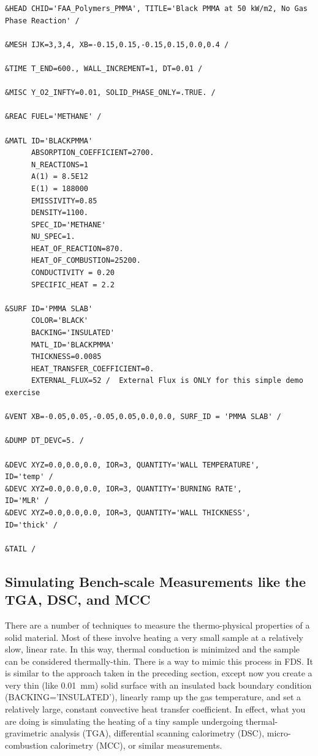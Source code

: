 \documentclass[11pt]{book}
\begin{document}
\begin{lstlisting}[basicstyle=\scriptsize\ttfamily]
&HEAD CHID='FAA_Polymers_PMMA', TITLE='Black PMMA at 50 kW/m2, No Gas Phase Reaction' /

&MESH IJK=3,3,4, XB=-0.15,0.15,-0.15,0.15,0.0,0.4 /

&TIME T_END=600., WALL_INCREMENT=1, DT=0.01 /

&MISC Y_O2_INFTY=0.01, SOLID_PHASE_ONLY=.TRUE. /

&REAC FUEL='METHANE' /

&MATL ID='BLACKPMMA'
      ABSORPTION_COEFFICIENT=2700.
      N_REACTIONS=1
      A(1) = 8.5E12
      E(1) = 188000
      EMISSIVITY=0.85
      DENSITY=1100.
      SPEC_ID='METHANE'
      NU_SPEC=1.
      HEAT_OF_REACTION=870.
      HEAT_OF_COMBUSTION=25200.
      CONDUCTIVITY = 0.20
      SPECIFIC_HEAT = 2.2

&SURF ID='PMMA SLAB'
      COLOR='BLACK'
      BACKING='INSULATED'
      MATL_ID='BLACKPMMA'
      THICKNESS=0.0085
      HEAT_TRANSFER_COEFFICIENT=0.
      EXTERNAL_FLUX=52 /  External Flux is ONLY for this simple demo exercise

&VENT XB=-0.05,0.05,-0.05,0.05,0.0,0.0, SURF_ID = 'PMMA SLAB' /

&DUMP DT_DEVC=5. /

&DEVC XYZ=0.0,0.0,0.0, IOR=3, QUANTITY='WALL TEMPERATURE',     ID='temp' /
&DEVC XYZ=0.0,0.0,0.0, IOR=3, QUANTITY='BURNING RATE',         ID='MLR' /
&DEVC XYZ=0.0,0.0,0.0, IOR=3, QUANTITY='WALL THICKNESS',       ID='thick' /

&TAIL /
\end{lstlisting}


\subsection{Simulating Bench-scale Measurements like the TGA, DSC, and MCC}

\label{info:TGA_DSC_MCC}

There are a number of techniques to measure the thermo-physical properties of a solid material. Most of these involve heating a very small sample at a relatively slow, linear rate. In this way, thermal conduction is minimized and the sample can be considered thermally-thin. There is a way to mimic this process in FDS. It is similar to the approach taken in the preceding section, except now you create a very thin (like 0.01~mm) solid surface with an insulated back boundary condition ({\ct BACKING='INSULATED'}), linearly ramp up the gas temperature, and set a relatively large, constant convective heat transfer coefficient. In effect, what you are doing is simulating the heating of a tiny sample undergoing thermal-gravimetric analysis (TGA), differential scanning calorimetry (DSC), micro-combustion calorimetry (MCC), or similar measurements.
\end{document}
